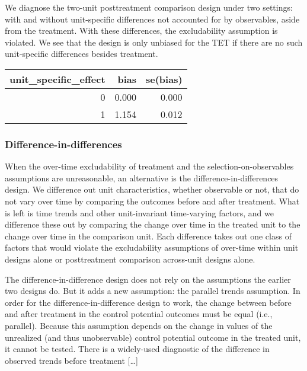 \documentclass[
]{article}
\begin{document}
We diagnose the two-unit posttreatment comparison design under two
settings: with and without unit-specific differences not accounted for
by observables, aside from the treatment. With these differences, the
excludability assumption is violated. We see that the design is only
unbiased for the TET if there are no such unit-specific differences
besides treatment.

\begin{tabular}{rrr}
\toprule
unit\_specific\_effect & bias & se(bias)\\
\midrule
0 & 0.000 & 0.000\\
1 & 1.154 & 0.012\\
\bottomrule
\end{tabular}

\hypertarget{difference-in-differences}{%
\subsubsection{Difference-in-differences}\label{difference-in-differences}}

When the over-time excludability of treatment and the
selection-on-observables assumptions are unreasonable, an alternative is
the difference-in-differences design. We difference out unit
characteristics, whether observable or not, that do not vary over time
by comparing the outcomes before and after treatment. What is left is
time trends and other unit-invariant time-varying factors, and we
difference these out by comparing the change over time in the treated
unit to the change over time in the comparison unit. Each difference
takes out one class of factors that would violate the excludability
assumptions of over-time within unit designs alone or posttreatment
comparison across-unit designs alone.

The difference-in-difference design does not rely on the assumptions the
earlier two designs do. But it adds a new assumption: the parallel
trends assumption. In order for the difference-in-difference design to
work, the change between before and after treatment in the control
potential outcomes must be equal (i.e., parallel). Because this
assumption depends on the change in values of the unrealized (and thus
unobservable) control potential outcome in the treated unit, it cannot
be tested. There is a widely-used diagnostic of the difference in
observed trends before treatment {[}\ldots{]}
\end{document}
